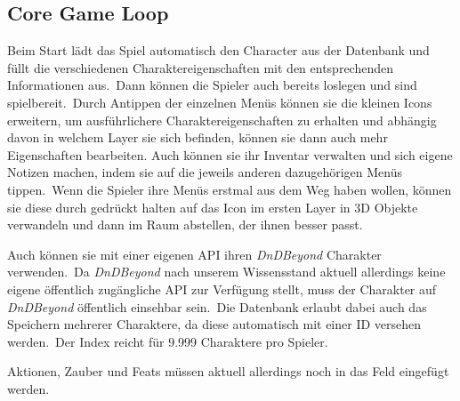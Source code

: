 \subsection{Core Game Loop}\label{subsec:chapter_gameloop}

Beim Start lädt das Spiel automatisch den Character aus der Datenbank und füllt die verschiedenen Charaktereigenschaften
mit den entsprechenden Informationen aus.\ Dann können die Spieler auch bereits loslegen und sind spielbereit.\ Durch
Antippen der einzelnen Menüs können sie die kleinen Icons erweitern, um ausführlichere Charaktereigenschaften zu erhalten
und abhängig davon in welchem Layer sie sich befinden, können sie dann auch mehr Eigenschaften bearbeiten.
Auch können sie ihr Inventar verwalten und sich eigene Notizen machen, indem sie auf die jeweils anderen dazugehörigen
Menüs tippen.\ Wenn die Spieler ihre Menüs erstmal aus dem Weg haben wollen, können sie diese durch gedrückt halten auf
das Icon im ersten Layer in 3D Objekte verwandeln und dann im Raum abstellen, der ihnen besser passt.

Auch können sie mit einer eigenen API ihren \textit{DnDBeyond} Charakter verwenden.\ Da \textit{DnDBeyond} nach unserem
Wissensstand aktuell allerdings keine eigene öffentlich zugängliche API zur Verfügung stellt, muss der Charakter auf
\textit{DnDBeyond} öffentlich einsehbar sein.\ Die Datenbank erlaubt dabei auch das Speichern mehrerer Charaktere, da
diese automatisch mit einer ID versehen werden.\ Der Index reicht für 9.999 Charaktere pro Spieler.

Aktionen, Zauber und Feats müssen aktuell allerdings noch in das Feld eingefügt werden.
\newblock